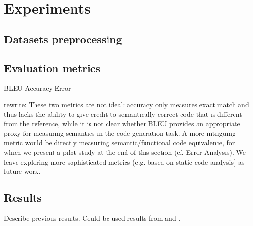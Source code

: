 \chapter{Experiments} \label{Chapter5} 


\section{Datasets preprocessing} \label{preprocessing}

\section{Evaluation metrics}
BLEU
Accuracy
Error

rewrite: These two metrics are not ideal: accuracy only measures exact match and thus lacks the ability to give credit to semantically correct code that is different from the reference, while it is not clear whether BLEU provides an appropriate proxy for measuring semantics in the code generation task. A more
intriguing metric would be directly measuring semantic/functional code equivalence, for which we present a pilot study
at the end of this section (cf. Error Analysis). We leave exploring more sophisticated metrics (e.g. based on static code
analysis) as future work.

\section{Results}

Describe previous results. Could be used results from \cite{Yin2017} and \cite{Barone2017}.


